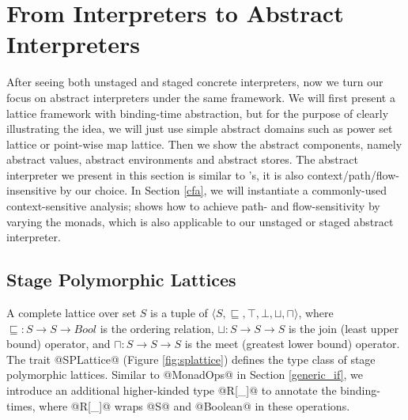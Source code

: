 \section{From Interpreters to Abstract Interpreters} \label{unstaged_abs}

After seeing both unstaged and staged concrete interpreters, now we turn our
focus on abstract interpreters under the same framework. We will first present a
lattice framework with binding-time abstraction, but for the purpose of clearly
illustrating the idea, we will just use simple abstract domains such as power set
lattice or point-wise map lattice. Then we show the abstract components, namely
abstract values, abstract environments and abstract stores.
The abstract interpreter we present in this section is similar to
\citet{DBLP:journals/pacmpl/DaraisLNH17}'s, it is also
context/path/flow-insensitive by our choice.  In Section \ref{cfa}, we will
instantiate a commonly-used context-sensitive analysis;
\citet{Darais:2015:GTM:2814270.2814308} shows how to achieve path- and
flow-sensitivity by varying the monads, which is also applicable to our unstaged
or staged abstract interpreter.

\subsection{Stage Polymorphic Lattices} \label{stagedpoly_lat}

A complete lattice over set $S$ is a tuple of $\langle S, \sqsubseteq, \top,
\bot, \sqcup, \sqcap \rangle$, where $\sqsubseteq : S \to S \to Bool$ is the
ordering relation, $\sqcup: S \to S \to S$ is the join (least upper bound)
operator, and $\sqcap: S \to S \to S$ is the meet (greatest lower bound)
operator. The trait @SPLattice@ (Figure \ref{fig:splattice}) defines the type
class of stage polymorphic lattices. Similar to @MonadOps@ in Section
\ref{generic_if}, we introduce an additional higher-kinded type @R[_]@ to
annotate the binding-times, where @R[_]@ wraps @S@ and @Boolean@ in these
operations.

